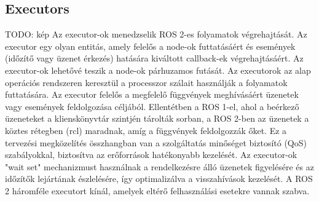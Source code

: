 \subsection{Executors}
TODO: kép
Az executor-ok menedzselik ROS 2-es folyamatok végrehajtását. Az executor egy olyan entitás, amely felelős a node-ok futtatásáért és események (időzítő vagy üzenet érkezés) hatására kiváltott callback-ek végrehajtásáért. Az executor-ok lehetővé teszik a node-ok párhuzamos futását. Az executorok az alap operációs rendszeren keresztül a processzor szálait használják a folyamatok futtatására. Az executor felelős a megfelelő függvények meghívásáért üzenetek vagy események feldolgozása céljából. Ellentétben a ROS 1-el, ahol a beérkező üzeneteket a klienskönyvtár szintjén tárolták sorban, a ROS 2-ben az üzenetek a köztes rétegben (rcl) maradnak, amíg a függvények feldolgozzák őket. Ez a tervezési megközelítés összhangban van a szolgáltatás minőséget biztosító (QoS) szabályokkal, biztosítva az erőforrások hatékonyabb kezelését. Az executor-ok "wait set" mechanizmust használnak a rendelkezésre álló üzenetek figyelésére és az időzítők lejártának észlelésére, így optimalizálva a visszahívások kezelését. A ROS 2 háromféle executort kínál, amelyek eltérő felhasználási esetekre vannak szabva. \cite{ros2} \cite{ros2_design}

